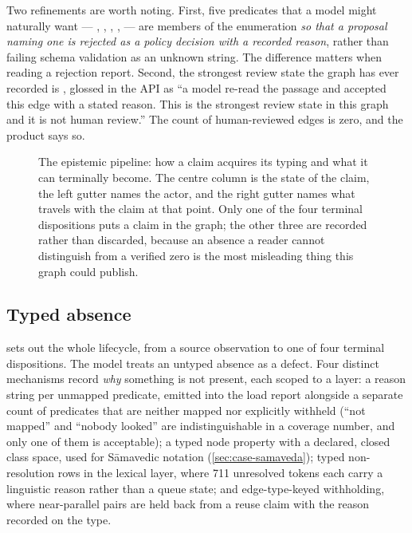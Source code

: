 Two refinements are worth noting. First, five predicates that a model might naturally
want --- , , , ,
 --- are members of the enumeration \emph{so that a proposal naming one
is rejected as a policy decision with a recorded reason}, rather than failing schema
validation as an unknown string. The difference matters when reading a rejection
report. Second, the strongest review state the graph has ever recorded is
, glossed in the API as ``a model re-read the passage and
accepted this edge with a stated reason. This is the strongest review state in this
graph and it is not human review.'' The count of human-reviewed edges is zero, and the
product says so.

\begin{figure}[tbp]
\centering
\resizebox{0.93\textwidth}{!}{}
\caption{The epistemic pipeline: how a claim acquires its typing and what it can
terminally become. The centre column is the state of the claim, the left gutter names
the actor, and the right gutter names what travels with the claim at that point.
Only one of the four terminal dispositions puts a claim in the graph; the other three
are recorded rather than discarded, because an absence a reader cannot distinguish
from a verified zero is the most misleading thing this graph could publish.}
\label{fig:epistemic}
\end{figure}

\subsection{Typed absence}
\label{sec:typed-absence}

 sets out the whole lifecycle, from a source observation to one
of four terminal dispositions. The model treats an untyped absence as a defect. Four distinct mechanisms record
\emph{why} something is not present, each scoped to a layer: a reason string per
unmapped predicate, emitted into the load report alongside a separate count of
predicates that are neither mapped nor explicitly withheld (``not mapped'' and
``nobody looked'' are indistinguishable in a coverage number, and only one of them is
acceptable); a typed node property with a declared, closed class space, used for
S\=amavedic notation (\cref{sec:case-samaveda}); typed non-resolution rows in the
lexical layer, where 711 unresolved tokens each carry a linguistic reason rather than
a queue state; and edge-type-keyed withholding, where near-parallel pairs are held
back from a reuse claim with the reason recorded on the type.

